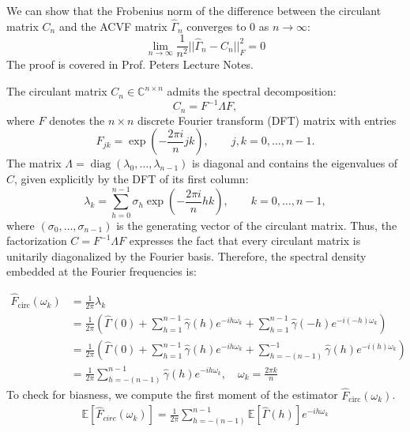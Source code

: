 \documentclass[preprint]{aastex}
\theoremstyle{nonitalicname}
\theoremstyle{plain}
\theoremstyle{remark}
\begin{document}
We can show that the Frobenius norm of the difference between the circulant matrix $C_n$ and the ACVF matrix $\widehat \Gamma_n$ converges to 0 as $n  \to \infty$:
\begin{equation}
    \lim_{n\to \infty} \frac{1}{n^2} ||\widehat \Gamma_n - C_n||^2_F = 0 
\end{equation}
The proof is covered in Prof. Peters Lecture Notes.

The circulant matrix $C_n \in \mathbb{C}^{n\times n}$ admits the spectral decomposition:
\begin{equation}\label{eq:circulant_decomp}
    C_n = F^{-1}\Lambda F,
\end{equation}
where $F$ denotes the $n\times n$ discrete Fourier transform (DFT) matrix
with entries 
\begin{equation}
    F_{jk} = \exp\!\left(-\frac{2\pi i}{n} jk \right),\qquad j,k=0,\dots,n-1.
\end{equation}
The matrix $\Lambda = \operatorname{diag}(\lambda_0,\dots,\lambda_{n-1})$
is diagonal and contains the eigenvalues of $C$, given explicitly by the
DFT of its first column:
\begin{equation}
    \lambda_k = \sum_{h=0}^{n-1} \sigma_h \exp\!\left(-\frac{2\pi i}{n} hk \right),
    \qquad k=0,\dots,n-1,
\end{equation}
where $(\sigma_0,\dots,\sigma_{n-1})$ is the generating vector of the circulant matrix.  
Thus, the factorization $C = F^{-1}\Lambda F$ expresses the fact that every circulant matrix is unitarily diagonalized by the Fourier basis. 
Therefore, the spectral density embedded at the Fourier frequencies is:

\begin{equation}
\begin{aligned}
     \widehat F_{\text{circ}}(\omega_k) &= \frac{1}{2\pi}\lambda_k \\
     &= \frac{1}{2\pi} \left( \widehat \Gamma(0) + \sum_{h=1}^{n-1} \hat\gamma(h)e^{-ih\omega_k} +  \sum_{h=1}^{n-1} \hat\gamma(-h)e^{-i(-h)\omega_k} \right)\\
     &=  \frac{1}{2\pi} \left( \widehat \Gamma(0) + \sum_{h=1}^{n-1} \hat\gamma(h)e^{-ih\omega_k} + \sum_{h=-(n-1)}^{-1}  \hat\gamma(h)e^{-i(h)\omega_k}\right)\\
     &=  \frac{1}{2\pi}  \sum_{h=-(n-1)}^{n-1} \hat\gamma(h)e^{-ih\omega_k},
\quad \omega_k = \frac{2 \pi k}{n}
\end{aligned}
\end{equation}
To check for biasness, we compute the first moment of the estimator $\widehat F_{\text{circ}}(\omega_k)$. 
\begin{equation}
    \begin{aligned}
        \mathbb{E} [\widehat F_{circ} (\omega_k)] = \frac{1}{2\pi}  \sum_{h=-(n-1)}^{n-1} \mathbb{E}\left[ \widehat \Gamma(h)\right]e^{-ih\omega_k}
    \end{aligned}
\end{equation}
\end{document}
